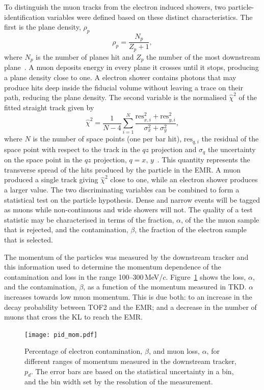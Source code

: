To distinguish the muon tracks from the electron induced showers,
two particle-identification variables were defined based on these
distinct characteristics.
The first is the plane density, $\rho_p$
\begin{equation}
  \rho_p = \frac{N_p}{Z_p+1},
\end{equation}
where $N_p$ is the number of planes hit and $Z_p$ the number of the
most downstream plane~\cite{2015JInst..10P2012A}.
A muon deposits energy in every plane it crosses until it stops,
producing a plane density close to one.
A electron shower contains photons that may produce hits deep inside
the fiducial volume without leaving a trace on their path, reducing
the plane density.
The second variable is the normalised $\hat{\chi}^2$ of the fitted
straight track given by
\begin{equation}
  \hat{\chi}^2=\frac{1}{N-4}\sum_{i=1}^{N}\frac{\text{res}_{x,i}^2+\text{res}_{y,i}^2}{\sigma_x^2+\sigma_y^2},
\end{equation}
where $N$ is the number of space points (one per bar hit),
$\text{res}_{q,i}$ the residual of the space point with respect to the
track in the $qz$ projection and $\sigma_q$ the uncertainty on the
space point in the $qz$ projection, $q=x,\,y$~\cite{Drielsma:thesis}.
This quantity represents the transverse spread of the hits produced by
the particle in the EMR.
A muon produced a single track giving
$\hat{\chi}^2$ close to one, while an electron shower produces a larger value.
The two discriminating variables can be combined to form a statistical
test on the particle hypothesis. 
Dense and narrow events will be tagged as muons while non-continuous
and wide showers will not.  
The quality of a test statistic may be characterised in terms of the
fraction, $\alpha$, of the the muon sample that is rejected, and the 
contamination, $\beta$, the fraction of the electron sample that is
selected. 


The momentum of the particles was measured by the downstream tracker 
and this information used to determine the momentum dependence of the 
contamination and loss in the range 100--300\,MeV/$c$.
Figure~\ref{fig:emr_pid_mom} shows the loss, $\alpha$, and the
contamination, $\beta$, as a function of the momentum measured in
TKD.
$\alpha$ increases towards low muon momentum.
This is due both: to an increase in the decay probability between TOF2
and the EMR; and a decrease in the number of muons that cross the KL to
reach the EMR. 
\begin{figure}
  \begin{center}
    \texttt{[image: pid\_mom.pdf]}
  \end{center}
  \caption{
    Percentage of electron contamination, $\beta$, and muon loss,
    $\alpha$, for different ranges of momentum measured in the
    downstream tracker, $p_d$.
    The error bars are based on the statistical uncertainty in a bin,
    and the bin width set by the resolution of the measurement.
  }
  \label{fig:emr_pid_mom}
\end{figure}
